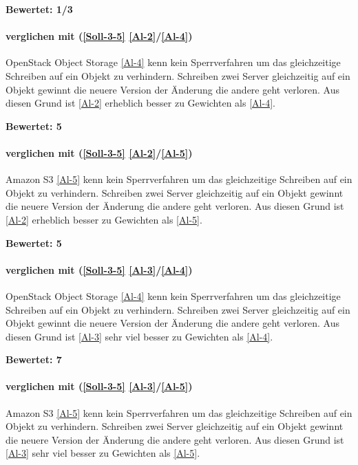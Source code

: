 \textbf{Bewertet: 1/3}

\paragraph*{  verglichen mit  (\ref{Soll-3-5} \ref{Al-2}/\ref{Al-4})}
OpenStack Object Storage \ref{Al-4} kenn kein Sperrverfahren um das gleichzeitige Schreiben auf ein Objekt zu verhindern. Schreiben zwei Server gleichzeitig auf ein Objekt gewinnt die neuere Version der Änderung die andere geht verloren. Aus diesen Grund ist  \ref{Al-2} erheblich besser zu Gewichten als  \ref{Al-4}.

\textbf{Bewertet: 5}

\paragraph*{  verglichen mit  (\ref{Soll-3-5} \ref{Al-2}/\ref{Al-5})}
Amazon S3 \ref{Al-5} kenn kein Sperrverfahren um das gleichzeitige Schreiben auf ein Objekt zu verhindern. Schreiben zwei Server gleichzeitig auf ein Objekt gewinnt die neuere Version der Änderung die andere geht verloren. Aus diesen Grund ist  \ref{Al-2} erheblich besser zu Gewichten als  \ref{Al-5}.

\textbf{Bewertet: 5}


\paragraph*{  verglichen mit  (\ref{Soll-3-5} \ref{Al-3}/\ref{Al-4})}
OpenStack Object Storage \ref{Al-4} kenn kein Sperrverfahren um das gleichzeitige Schreiben auf ein Objekt zu verhindern. Schreiben zwei Server gleichzeitig auf ein Objekt gewinnt die neuere Version der Änderung die andere geht verloren. Aus diesen Grund ist  \ref{Al-3} sehr viel besser zu Gewichten als  \ref{Al-4}.

\textbf{Bewertet: 7}

\paragraph*{  verglichen mit  (\ref{Soll-3-5} \ref{Al-3}/\ref{Al-5})}
Amazon S3 \ref{Al-5} kenn kein Sperrverfahren um das gleichzeitige Schreiben auf ein Objekt zu verhindern. Schreiben zwei Server gleichzeitig auf ein Objekt gewinnt die neuere Version der Änderung die andere geht verloren. Aus diesen Grund ist  \ref{Al-3} sehr viel besser zu Gewichten als  \ref{Al-5}.

